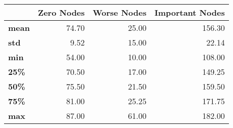 \begin{tabular}{lrrr}
\toprule
{} &  Zero Nodes &  Worse Nodes &  Important Nodes \\
\midrule
\textbf{mean} &       74.70 &        25.00 &           156.30 \\
\textbf{std } &        9.52 &        15.00 &            22.14 \\
\textbf{min } &       54.00 &        10.00 &           108.00 \\
\textbf{25\% } &       70.50 &        17.00 &           149.25 \\
\textbf{50\% } &       75.50 &        21.50 &           159.50 \\
\textbf{75\% } &       81.00 &        25.25 &           171.75 \\
\textbf{max } &       87.00 &        61.00 &           182.00 \\
\bottomrule
\end{tabular}
